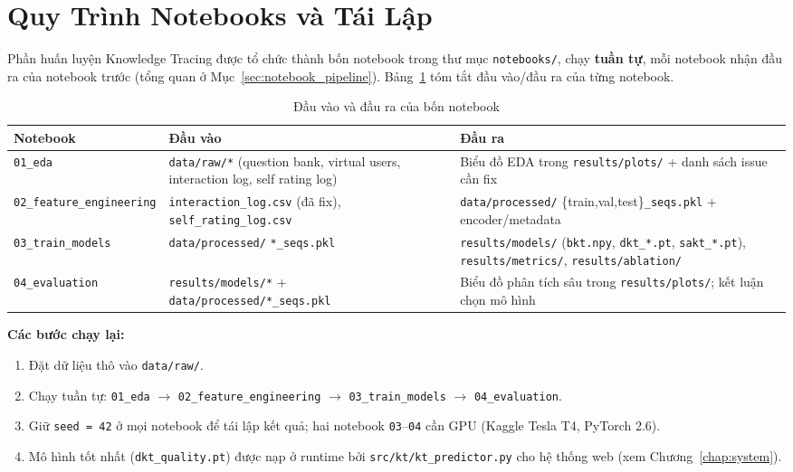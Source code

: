 \documentclass[12pt, a4paper]{report}
\begin{document}
\section{Quy Trình Notebooks và Tái Lập}
\label{apx:reproducibility}

Phần huấn luyện Knowledge Tracing được tổ chức thành bốn notebook trong thư mục \texttt{notebooks/}, chạy \textbf{tuần tự}, mỗi notebook nhận đầu ra của notebook trước (tổng quan ở Mục~\ref{sec:notebook_pipeline}). Bảng~\ref{tab:notebook_io} tóm tắt đầu vào/đầu ra của từng notebook.

\begin{table}[H]
  \centering
  \caption{Đầu vào và đầu ra của bốn notebook}
  \label{tab:notebook_io}
  \begin{tabular}{p{2.5cm}p{4.2cm}p{4.6cm}}
    \toprule
    \textbf{Notebook} & \textbf{Đầu vào} & \textbf{Đầu ra} \\
    \midrule
    \texttt{01\_eda} &
    \texttt{data/raw/*} (question bank, virtual users, interaction log, self rating log) &
    Biểu đồ EDA trong \texttt{results/plots/} + danh sách issue cần fix \\
    \addlinespace
    \texttt{02\_feature\_engineering} &
    \texttt{interaction\_log.csv} (đã fix), \texttt{self\_rating\_log.csv} &
    \texttt{data/processed/} \{train,val,test\}\texttt{\_seqs.pkl} + encoder/metadata \\
    \addlinespace
    \texttt{03\_train\_models} &
    \texttt{data/processed/} \texttt{*\_seqs.pkl} &
    \texttt{results/models/} (\texttt{bkt.npy}, \texttt{dkt\_*.pt}, \texttt{sakt\_*.pt}), \texttt{results/metrics/}, \texttt{results/ablation/} \\
    \addlinespace
    \texttt{04\_evaluation} &
    \texttt{results/models/*} + \texttt{data/processed/*\_seqs.pkl} &
    Biểu đồ phân tích sâu trong \texttt{results/plots/}; kết luận chọn mô hình \\
    \bottomrule
  \end{tabular}
\end{table}

\noindent\textbf{Các bước chạy lại:}
\begin{enumerate}
  \item Đặt dữ liệu thô vào \texttt{data/raw/}.
  \item Chạy tuần tự: \texttt{01\_eda} $\to$ \texttt{02\_feature\_engineering} $\to$ \texttt{03\_train\_models} $\to$ \texttt{04\_evaluation}.
  \item Giữ \texttt{seed = 42} ở mọi notebook để tái lập kết quả; hai notebook \texttt{03}--\texttt{04} cần GPU (Kaggle Tesla T4, PyTorch 2.6).
  \item Mô hình tốt nhất (\texttt{dkt\_quality.pt}) được nạp ở runtime bởi \texttt{src/kt/kt\_predictor.py} cho hệ thống web (xem Chương~\ref{chap:system}).
\end{enumerate}
\end{document}
